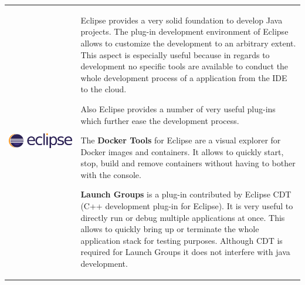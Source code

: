 \begin{table}[h!]
  \centering
  \begin{tabular}{ c m{9cm} }
    \begin{minipage}{.3\textwidth}
      \includegraphics[width=\linewidth]{images/dependencies/eclipse}
    \end{minipage}&
	Eclipse provides a very solid foundation to develop Java projects. The plug-in
	development environment of Eclipse allows to customize the development to an
	arbitrary extent. This aspect is especially useful because in regards to \ms{}
	development no specific tools are available to conduct the whole development
	process of a \ms{} application from the IDE to the cloud.
	
	Also Eclipse provides a number of very useful plug-ins which further ease the
	\ms{} development process.
	
	The \textbf{Docker Tools} for Eclipse are a visual explorer  for Docker images
	and containers. It allows to quickly start, stop, build and remove containers
	without having to bother with the console.
	
	\textbf{Launch Groups} is a plug-in contributed by Eclipse CDT (C++ development
	plug-in for Eclipse). It is very useful to directly run or debug multiple
	applications at once. This allows to quickly bring up or terminate the whole
	application stack for testing purposes. Although CDT is required for Launch
	Groups it does not interfere with java development.
  \end{tabular}
\end{table}
\FloatBarrier































